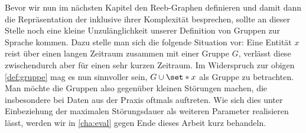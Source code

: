 Bevor wir nun im nächsten Kapitel den Reeb-Graphen definieren und damit dann die Repräsentation der \GrpStruktur inklusive ihrer Komplexität besprechen, sollte an dieser Stelle noch eine kleine Unzulänglichkeit unserer Definition von Gruppen zur Sprache kommen.
Dazu stelle man sich die folgende Situation vor: Eine Entität $x$ reist über einen langen Zeitraum zusammen mit einer Gruppe $G$, verlässt diese zwischendurch aber für einen sehr kurzen Zeitraum.
Im Widerspruch zur obigen \cref{def:gruppe} mag es nun sinnvoller sein, $G \cup \set*{x}$ als Gruppe zu betrachten.
Man möchte die Gruppen also  gegenüber kleinen Störungen machen, die insbesondere bei Daten aus der Praxis oftmals auftreten.
Wie sich dies unter Einbeziehung der maximalen Störungsdauer als weiteren Parameter realisieren lässt, werden wir in \cref{cha:eval} gegen Ende dieses Arbeit kurz behandeln.
